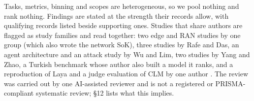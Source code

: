 Tasks, metrics, binning and scopes are heterogeneous, so we pool nothing and rank nothing. Findings are stated at the strength their records allow, with qualifying records listed beside supporting ones. Studies that share authors are flagged as study families and read together: two edge and RAN studies by one group (which also wrote the network SoK), three studies by Rafe and Das, an agent architecture and an attack study by Wu and Lim, two studies by Yang and Zhao, a Turkish benchmark whose author also built a model it ranks, and a reproduction of Laya and a judge evaluation of CLM by one author \citep{arxiv2609_22753,arxiv2609_23136,arxiv2609_24052,arxiv2610_00213,arxiv2610_00346,arxiv2609_26532,arxiv2609_28613,arxiv2609_29283,arxiv2610_06354,arxiv2610_02293,arxiv2610_06744,arxiv2609_33843,arxiv2610_07177}. The review was carried out by one AI-assisted reviewer and is not a registered or PRISMA-compliant systematic review; §12 lists what this implies.
